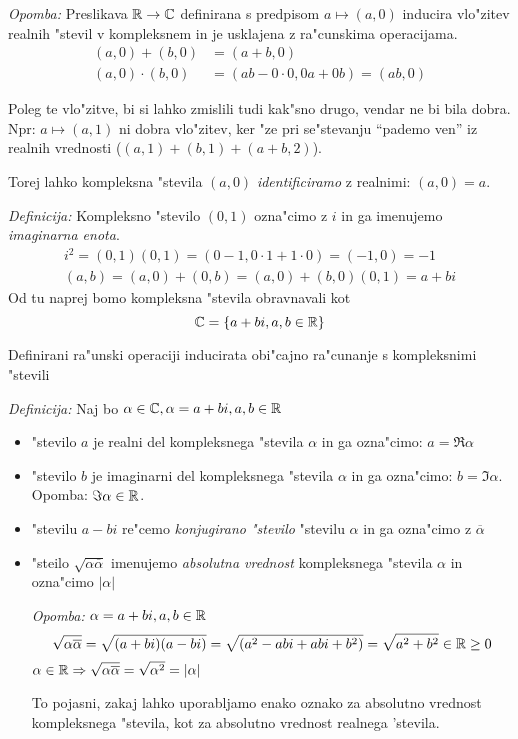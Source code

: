 \emph{Opomba:} Preslikava $\mathbb{R} \rightarrow \mathbb{C}$ definirana s predpisom $a \mapsto (a, 0)$ inducira vlo"zitev realnih "stevil v kompleksnem in je usklajena z ra"cunskima operacijama.
\begin{align*}
(a, 0) + (b, 0) &= (a + b, 0)\\
(a, 0) \cdot (b, 0) &= (ab - 0\cdot 0, 0a + 0b) = (ab, 0)
\end{align*}

Poleg te vlo"zitve, bi si lahko zmislili tudi kak"sno drugo, vendar ne bi bila dobra. Npr: $a \mapsto (a, 1)$ ni dobra vlo"zitev, ker "ze pri se"stevanju ``pademo ven'' iz realnih vrednosti ($(a, 1) + (b, 1) + (a+b, 2)$).

Torej lahko kompleksna "stevila $(a, 0)$ \emph{identificiramo} z realnimi: $(a, 0) = a$.

\emph{Definicija:} Kompleksno "stevilo $(0, 1)$ ozna"cimo z $i$ in ga imenujemo \emph{imaginarna enota}.
\begin{gather*}
	i^2 = (0, 1)(0, 1) = (0-1, 0\cdot 1 + 1\cdot 0) = (-1, 0) = -1\\
	(a, b) = (a, 0) + (0, b) = (a, 0) + (b, 0) (0, 1) = a + bi
\end{gather*}
Od tu naprej bomo kompleksna "stevila obravnavali kot
\begin{equation*}
\mathbb{C} = \{a + bi, a, b \in \mathbb{R}\}
\end{equation*}

Definirani ra"unski operaciji inducirata obi"cajno ra"cunanje s kompleksnimi "stevili

\emph{Definicija:} Naj bo $\alpha \in \mathbb{C}, \alpha = a+bi, a, b \in \mathbb{R}$
\begin{itemize}
	\item "stevilo $a$ je realni del kompleksnega "stevila $\alpha$ in ga ozna"cimo: $a = \Re \alpha$
	\item "stevilo $b$ je imaginarni del kompleksnega "stevila $\alpha$ in ga ozna"cimo: $b = \Im \alpha$. Opomba: $\Im \alpha \in \mathbb{R}$.
	\item "stevilu $a - bi$ re"cemo \emph{konjugirano "stevilo} "stevilu $\alpha$ in ga ozna"cimo z $\overline{\alpha}$
	\item "steilo $\sqrt{\alpha \overline{\alpha}}$ imenujemo \emph{absolutna vrednost} kompleksnega "stevila $\alpha$ in ozna"cimo $|\alpha|$
	
	\emph{Opomba:} $\alpha = a + bi, a, b \in \mathbb{R}$
	\begin{equation*}
	\sqrt{\alpha \overline{\alpha}} = \sqrt{(a + bi)(a-bi)} = \sqrt{(a^2 - abi + abi + b^2)} = \sqrt{a^2 + b^2} \in \mathbb{R} \geq 0
	\end{equation*}
	$\alpha \in \mathbb{R} \Rightarrow \sqrt{\alpha \overline{\alpha}} = \sqrt{\alpha^2} = |\alpha|$
	
	To pojasni, zakaj lahko uporabljamo enako oznako za absolutno vrednost kompleksnega "stevila, kot za absolutno vrednost realnega 'stevila.
\end{itemize}

